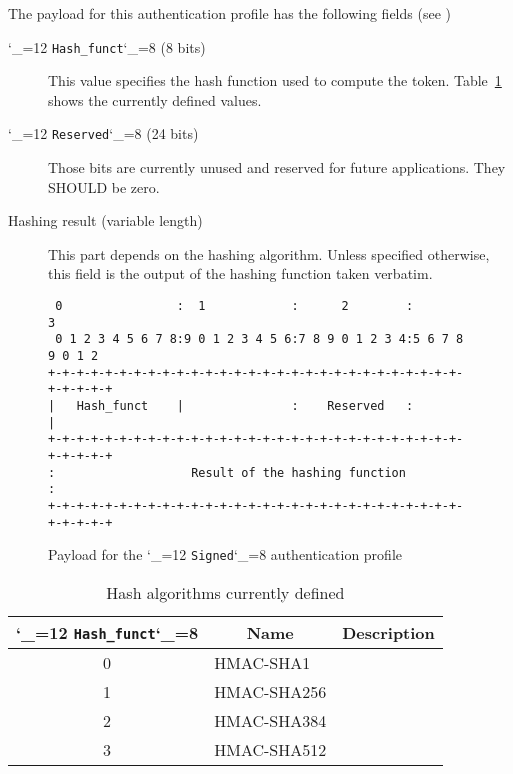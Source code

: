 \documentclass{rfc}
\def\ttt{\catcode`\_=12 \tttii}
\def\tttii#1!{{\tt #1}\catcode`\_=8{}}
\begin{document}
The payload for this authentication profile has the following fields
(see )

\begin{description}
\item[\ttt Hash\_funct! (8 bits)]  This value specifies the hash function used
  to compute the token.  Table~\ref{table:hashes} shows the currently
  defined values.
\item[\ttt Reserved! (24 bits)] Those bits are currently unused and
  reserved for future applications.  They SHOULD be zero.
\item[Hashing result (variable length)] This part depends on the
  hashing algorithm.  Unless specified otherwise, this field is the
  output of the hashing function taken verbatim.
\end{description}
%

\begin{figure}
  \begin{center}
    \begin{verbatim}
 0                :  1            :      2        :          3
 0 1 2 3 4 5 6 7 8:9 0 1 2 3 4 5 6:7 8 9 0 1 2 3 4:5 6 7 8 9 0 1 2
+-+-+-+-+-+-+-+-+-+-+-+-+-+-+-+-+-+-+-+-+-+-+-+-+-+-+-+-+-+-+-+-+-+
|   Hash_funct    |               :    Reserved   :               |
+-+-+-+-+-+-+-+-+-+-+-+-+-+-+-+-+-+-+-+-+-+-+-+-+-+-+-+-+-+-+-+-+-+
:                   Result of the hashing function                :
+-+-+-+-+-+-+-+-+-+-+-+-+-+-+-+-+-+-+-+-+-+-+-+-+-+-+-+-+-+-+-+-+-+
    \end{verbatim}
  \end{center}
\caption{Payload for the \ttt Signed! authentication profile
  \label{fig:signed_payload}} 
\end{figure}

\begin{table}
\caption{Hash algorithms currently defined \label{table:hashes}}
  \begin{center}
    \begin{tabular}{|c|l|l|}
\hline
    \multicolumn{1}{|c}{\ttt Hash\_funct!} &
    \multicolumn{1}{|c|}{Name} &
    \multicolumn{1}{|c|}{Description} \\
\hline
\hline
      0 & HMAC-SHA1 & \cite{HMAC, SHA1} \\
      1 & HMAC-SHA256 & \cite{HMAC, SHA1} \\
      2 & HMAC-SHA384 & \cite{HMAC, SHA1} \\
      3 & HMAC-SHA512 & \cite{HMAC, SHA1} \\
\hline
    \end{tabular}
  \end{center}
\end{table}
\end{document}
